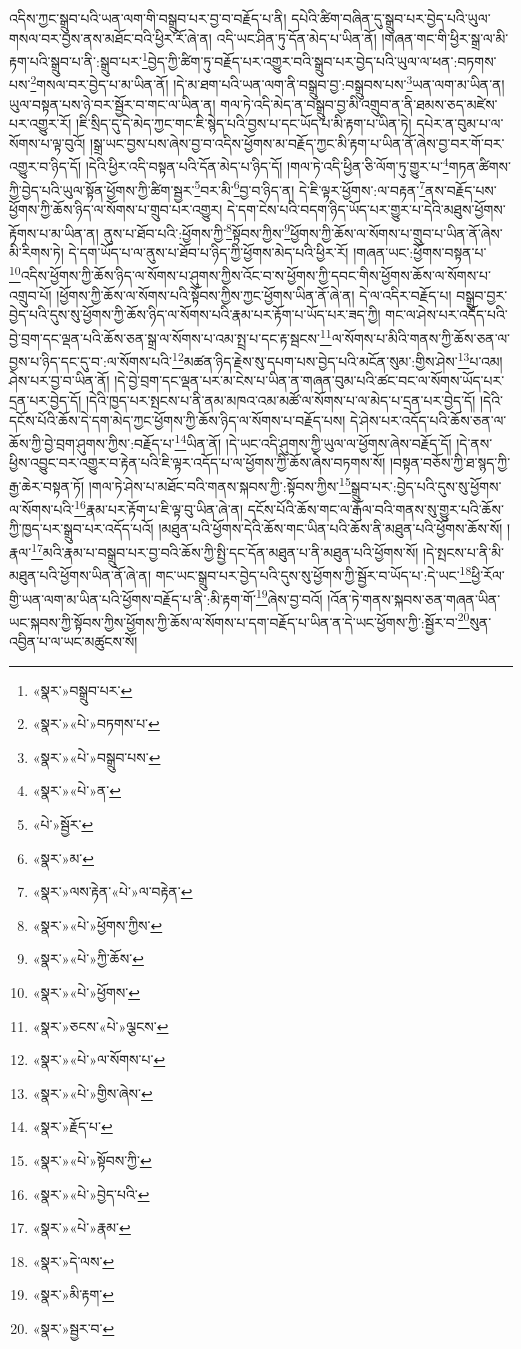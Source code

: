 འདིས་ཀྱང་སྒྲུབ་པའི་ཡན་ལག་གི་བསྒྲུབ་པར་བྱ་བ་བརྗོད་པ་ནི། དཔེའི་ཚིག་བཞིན་དུ་སྒྲུབ་པར་བྱེད་པའི་ཡུལ་གསལ་བར་བྱས་ནས་མཐོང་བའི་ཕྱིར་རོ་ཞེ་ན། འདི་ཡང་ཤིན་ཏུ་དོན་མེད་པ་ཡིན་ནོ། །གཞན་གང་གི་ཕྱིར་སྒྲ་ལ་མི་རྟག་པའི་སྒྲུབ་པ་ནི་:སྒྲུབ་པར་\footnote{«སྣར་»བསྒྲུབ་པར་}བྱེད་ཀྱི་ཚིག་ཏུ་བརྗོད་པར་འགྱུར་བའི་སྒྲུབ་པར་བྱེད་པའི་ཡུལ་ལ་ཕན་:བཏགས་པས་\footnote{«སྣར་»«པེ་»བཏགས་པ་}གསལ་བར་བྱེད་པ་མ་ཡིན་ནོ། །དེ་མ་ཐག་པའི་ཡན་ལག་ནི་བསྒྲུབ་བྱ་:བསྒྲུབས་པས་\footnote{«སྣར་»«པེ་»བསྒྲུབ་པས་}ཡན་ལག་མ་ཡིན་ན། ཡུལ་བསྟན་པས་ཉེ་བར་སྦྱོར་བ་གང་ལ་ཡིན་ན། གལ་ཏེ་འདི་མེད་ན་བསྒྲུབ་བྱ་མི་འགྲུབ་ན་ནི་ཐམས་ཅད་མཛེས་པར་འགྱུར་རོ། །ཇི་སྲིད་དུ་དེ་མེད་ཀྱང་གང་ཇི་སྙེད་པའི་བྱས་པ་དང་ཡོད་པ་མི་རྟག་པ་ཡིན་ཏེ། དཔེར་ན་བུམ་པ་ལ་སོགས་པ་ལྟ་བུའོ། །སྒྲ་ཡང་བྱས་པས་ཞེས་བྱ་བ་འདིས་ཕྱོགས་མ་བརྗོད་ཀྱང་མི་རྟག་པ་ཡིན་ནོ་ཞེས་བྱ་བར་གོ་བར་འགྱུར་བ་ཉིད་དོ། །དེའི་ཕྱིར་འདི་བསྟན་པའི་དོན་མེད་པ་ཉིད་དོ། །གལ་ཏེ་འདི་ཕྱིན་ཅི་ལོག་ཏུ་གྱུར་པ་\footnote{«སྣར་»«པེ་»ན་}གཏན་ཚིགས་ཀྱི་བྱེད་པའི་ཡུལ་སྟོན་ཕྱོགས་ཀྱི་ཚིག་སྦྱར་\footnote{«པེ་»སྦྱོར་}བར་མི་\footnote{«སྣར་»མ་}བྱ་བ་ཉིད་ན། དེ་ཇི་ལྟར་ཕྱོགས་:ལ་བརྟན་\footnote{«སྣར་»ལས་རྟེན་«པེ་»ལ་བརྟེན་}ནས་བརྗོད་པས་ཕྱོགས་ཀྱི་ཆོས་ཉིད་ལ་སོགས་པ་གྲུབ་པར་འགྱུར། དེ་དག་ངེས་པའི་བདག་ཉིད་ཡོད་པར་གྱུར་པ་དེའི་མཐུས་ཕྱོགས་རྟོགས་པ་མ་ཡིན་ན། ནུས་པ་ཐོབ་པའི་:ཕྱོགས་ཀྱི་\footnote{«སྣར་»«པེ་»ཕྱོགས་ཀྱིས་}སྟོབས་ཀྱིས་\footnote{«སྣར་»«པེ་»ཀྱི་ཆོས་}ཕྱོགས་ཀྱི་ཆོས་ལ་སོགས་པ་གྲུབ་པ་ཡིན་ནོ་ཞེས་མི་རིགས་ཏེ། དེ་དག་ཡོད་པ་ལ་ནུས་པ་ཐོབ་པ་ཉིད་ཀྱི་ཕྱོགས་མེད་པའི་ཕྱིར་རོ། །གཞན་ཡང་:ཕྱོགས་བསྟན་པ་\footnote{«སྣར་»«པེ་»ཕྱོགས་}འདིས་ཕྱོགས་ཀྱི་ཆོས་ཉིད་ལ་སོགས་པ་ཤུགས་ཀྱིས་འོང་བ་ས་ཕྱོགས་ཀྱི་དབང་གིས་ཕྱོགས་ཆོས་ལ་སོགས་པ་འགྲུབ་པོ། །ཕྱོགས་ཀྱི་ཆོས་ལ་སོགས་པའི་སྟོབས་ཀྱིས་ཀྱང་ཕྱོགས་ཡིན་ནོ་ཞེ་ན། དེ་ལ་འདིར་བརྗོད་པ། བསྒྲུབ་བྱར་བྱེད་པའི་དུས་སུ་ཕྱོགས་ཀྱི་ཆོས་ཉིད་ལ་སོགས་པའི་རྣམ་པར་རྟོག་པ་ཡོད་པར་ཟད་ཀྱི། གང་ལ་ཤེས་པར་འདོད་པའི་བྱེ་བྲག་དང་ལྡན་པའི་ཆོས་ཅན་སྒྲ་ལ་སོགས་པ་འམ་སྤྲ་པ་དང་རྟ་སྦངས་\footnote{«སྣར་»ཅངས་«པེ་»ལྕངས་}ལ་སོགས་པ་མིའི་གནས་ཀྱི་ཆོས་ཅན་ལ་བྱས་པ་ཉིད་དང་དུ་བ་:ལ་སོགས་པའི་\footnote{«སྣར་»«པེ་»ལ་སོགས་པ་}མཚན་ཉིད་རྗེས་སུ་དཔག་པས་བྱེད་པའི་མངོན་སུམ་:གྱིས་ཤེས་\footnote{«སྣར་»«པེ་»གྱིས་ཞེས་}པ་འམ། ཤེས་པར་བྱ་བ་ཡིན་ནོ། །དེ་བྱེ་བྲག་དང་ལྡན་པར་མ་ངེས་པ་ཡིན་ན་གཞན་བུམ་པའི་ཚང་བང་ལ་སོགས་ཡོད་པར་དྲན་པར་བྱེད་དོ། །དེའི་ཁྱད་པར་སྤངས་པ་ནི་ནམ་མཁའ་འམ་མཚོ་ལ་སོགས་པ་ལ་མེད་པ་དྲན་པར་བྱེད་དོ། །དེའི་དངོས་པོའི་ཆོས་དེ་དག་མེད་ཀྱང་ཕྱོགས་ཀྱི་ཆོས་ཉིད་ལ་སོགས་པ་བརྗོད་པས། དེ་ཤེས་པར་འདོད་པའི་ཆོས་ཅན་ལ་ཆོས་ཀྱི་བྱེ་བྲག་ཤུགས་ཀྱིས་:བརྗོད་པ་\footnote{«སྣར་»རྗོད་པ་}ཡིན་ནོ། །དེ་ཡང་འདི་ཤུགས་ཀྱི་ཡུལ་ལ་ཕྱོགས་ཞེས་བརྗོད་དོ། །དེ་ནས་ཕྱིས་འབྱུང་བར་འགྱུར་བ་རྟེན་པའི་ཇི་ལྟར་འདོད་པ་ལ་ཕྱོགས་ཀྱི་ཆོས་ཞེས་བཏགས་སོ། །བསྟན་བཅོས་ཀྱི་ཐ་སྙད་ཀྱི་རྒྱ་ཆེར་བསྟན་ཏོ། །གལ་ཏེ་ཤེས་པ་མཐོང་བའི་གནས་སྐབས་ཀྱི་:སྟོབས་ཀྱིས་\footnote{«སྣར་»«པེ་»སྟོབས་ཀྱི་}སྒྲུབ་པར་:བྱེད་པའི་དུས་སུ་ཕྱོགས་ལ་སོགས་པའི་\footnote{«སྣར་»«པེ་»བྱེད་པའི་}རྣམ་པར་རྟོག་པ་ཇི་ལྟ་བུ་ཡིན་ཞེ་ན། དངོས་པོའི་ཆོས་གང་ལ་རྒོལ་བའི་གནས་སུ་གྱུར་པའི་ཆོས་ཀྱི་ཁྱད་པར་སྒྲུབ་པར་འདོད་པའོ། །མཐུན་པའི་ཕྱོགས་དེའི་ཆོས་གང་ཡིན་པའི་ཆོས་ནི་མཐུན་པའི་ཕྱོགས་ཆོས་སོ། །རྣལ་\footnote{«སྣར་»«པེ་»རྣམ་}མའི་རྣམ་པ་བསྒྲུབ་པར་བྱ་བའི་ཆོས་ཀྱི་སྤྱི་དང་དོན་མཐུན་པ་ནི་མཐུན་པའི་ཕྱོགས་སོ། །དེ་སྤངས་པ་ནི་མི་མཐུན་པའི་ཕྱོགས་ཡིན་ནོ་ཞེ་ན། གང་ཡང་སྒྲུབ་པར་བྱེད་པའི་དུས་སུ་ཕྱོགས་ཀྱི་སྦྱོར་བ་ཡོད་པ་:དེ་ཡང་\footnote{«སྣར་»དེ་ལས་}ཕྱི་རོལ་གྱི་ཡན་ལག་མ་ཡིན་པའི་ཕྱོགས་བརྗོད་པ་ནི་:མི་རྟག་གོ་\footnote{«སྣར་»མི་རྟག་}ཞེས་བྱ་བའོ། །འོན་ཏེ་གནས་སྐབས་ཅན་གཞན་ཡིན་ཡང་སྐབས་ཀྱི་སྟོབས་ཀྱིས་ཕྱོགས་ཀྱི་ཆོས་ལ་སོགས་པ་དག་བརྗོད་པ་ཡིན་ན་དེ་ཡང་ཕྱོགས་ཀྱི་:སྦྱོར་བ་\footnote{«སྣར་»སྦྱར་བ་}སུན་འབྱིན་པ་ལ་ཡང་མཚུངས་སོ། 